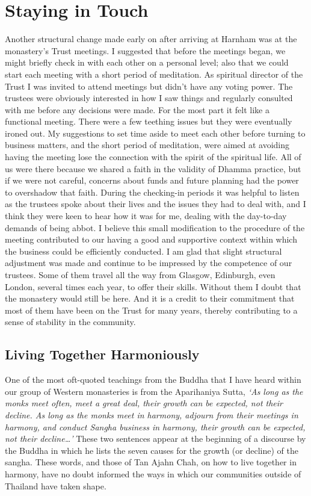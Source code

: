 \chapter{Staying in Touch}

Another structural change made early on after arriving at Harnham was at
the monastery's Trust meetings. I suggested that before the meetings
began, we might briefly check in with each other on a personal level;
also that we could start each meeting with a short period of meditation.
As spiritual director of the Trust I was invited to attend meetings but
didn't have any voting power. The trustees were obviously interested in
how I saw things and regularly consulted with me before any decisions
were made. For the most part it felt like a functional meeting. There
were a few teething issues but they were eventually ironed out. My
suggestions to set time aside to meet each other before turning to
business matters, and the short period of meditation, were aimed at
avoiding having the meeting lose the connection with the spirit of the
spiritual life. All of us were there because we shared a faith in the
validity of Dhamma practice, but if we were not careful, concerns about
funds and future planning had the power to overshadow that faith. During
the checking-in periods it was helpful to listen as the trustees spoke
about their lives and the issues they had to deal with, and I think they
were keen to hear how it was for me, dealing with the day-to-day demands
of being abbot. I believe this small modification to the procedure of
the meeting contributed to our having a good and supportive context
within which the business could be efficiently conducted. I am glad that
slight structural adjustment was made and continue to be impressed by
the competence of our trustees. Some of them travel all the way from
Glasgow, Edinburgh, even London, several times each year, to offer their
skills. Without them I doubt that the monastery would still be here. And
it is a credit to their commitment that most of them have been on the
Trust for many years, thereby contributing to a sense of stability in
the community.

\section{Living Together Harmoniously}

One of the most oft-quoted teachings from the Buddha that I have heard
within our group of Western monasteries is from the
Aparihaniya Sutta\cite{aparihaniya}, \emph{`As long as the monks meet often,
meet a great deal, their growth can be expected, not their decline. As
long as the monks meet in harmony, adjourn from their meetings in
harmony, and conduct Sangha business in harmony, their growth can be
expected, not their decline\ldots{}'} These two sentences appear at the
beginning of a discourse by the Buddha in which he lists the seven
causes for the growth (or decline) of the sangha. These words, and those
of Tan Ajahn Chah, on how to live together in harmony, have no doubt
informed the ways in which our communities outside of Thailand have
taken shape.

